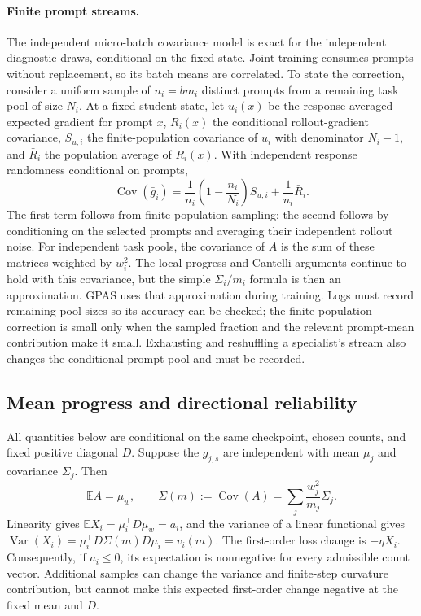 \paragraph{Finite prompt streams.}
The independent micro-batch covariance model is exact for the independent
diagnostic draws, conditional on the fixed state. Joint training consumes
prompts without replacement, so its batch means are correlated. To state
the correction, consider a uniform sample of $n_i=bm_i$ distinct prompts
from a remaining task pool of size $N_i$. At a fixed student state, let
$u_i(x)$ be the response-averaged expected gradient for prompt $x$,
$R_i(x)$ the conditional rollout-gradient covariance, $S_{u,i}$ the
finite-population covariance of $u_i$ with denominator $N_i-1$, and
$\bar R_i$ the population average of $R_i(x)$. With independent response
randomness conditional on prompts,
\begin{equation}
    \operatorname{Cov}(\bar g_i)
      =\frac1{n_i}\left(1-\frac{n_i}{N_i}\right)S_{u,i}
        +\frac1{n_i}\bar R_i.
    \label{eq:finite_population_covariance}
\end{equation}
The first term follows from finite-population sampling; the second
follows by conditioning on the selected prompts and averaging their
independent rollout noise. For independent task pools, the covariance of
$A$ is the sum of these matrices weighted by $w_i^2$. The local progress
and Cantelli arguments continue to hold with this covariance, but the
simple $\Sigma_i/m_i$ formula is then an approximation. GPAS uses that
approximation during training. Logs must record remaining pool sizes so
its accuracy can be checked; the finite-population correction is small
only when the sampled fraction and the relevant prompt-mean contribution
make it small. Exhausting and reshuffling a specialist's stream also
changes the conditional prompt pool and must be recorded.

\subsection{Mean progress and directional reliability}
\label{app:joint_progress}

All quantities below are conditional on the same checkpoint, chosen
counts, and fixed positive diagonal $D$. Suppose the $g_{j,s}$ are
independent with mean $\mu_j$ and covariance $\Sigma_j$. Then
\begin{equation}
    \mathbb E A=\mu_w,\qquad
    \Sigma(m):=\operatorname{Cov}(A)
      =\sum_j\frac{w_j^2}{m_j}\Sigma_j.
    \label{eq:combined_covariance}
\end{equation}
Linearity gives $\mathbb E X_i=\mu_i^\top D\mu_w=a_i$, and the
variance of a linear functional gives
$\operatorname{Var}(X_i)=\mu_i^\top D\Sigma(m)D\mu_i=v_i(m)$.
The first-order loss change is $-\eta X_i$. Consequently, if
$a_i\leq0$, its expectation is nonnegative for every admissible count
vector. Additional samples can change the variance and finite-step
curvature contribution, but cannot make this expected first-order
change negative at the fixed mean and $D$.

